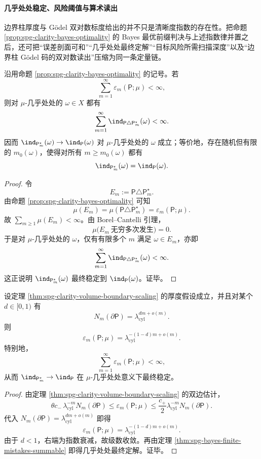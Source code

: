 
\paragraph{几乎处处稳定、风险阈值与算术读出}
边界柱厚度与 Gödel 双对数标度给出的并不只是清晰度指数的存在性。把命题 \ref{prop:spg-clarity-bayes-optimality} 的 Bayes 最优前缀判决与上述指数律并置之后，还可把“误差剖面可和”“几乎处处最终定解”“目标风险所需扫描深度”以及“边界柱 Gödel 码的双对数读出”压缩为同一条定量链。

\begin{theorem}\label{thm:spg-bayes-finite-mistakes-summable}
沿用命题 \ref{prop:spg-clarity-bayes-optimality} 的记号。若
\[
\sum_{m=1}^{\infty}\varepsilon_m(\mathsf P;\mu)<\infty,
\]
则对 \(\mu\)-几乎处处的 \(\omega\in X\) 都有
\[
\sum_{m=1}^{\infty}\ind_{\mathsf P\triangle \mathsf P_m^\star}(\omega)<\infty.
\]
因而 \(\ind_{\mathsf P_m^\star}(\omega)\to \ind_{\mathsf P}(\omega)\) 对 \(\mu\)-几乎处处的 \(\omega\) 成立；等价地，存在随机但有限的 \(m_0(\omega)\)，使得对所有 \(m\ge m_0(\omega)\) 都有
\[
\ind_{\mathsf P_m^\star}(\omega)=\ind_{\mathsf P}(\omega).
\]
\end{theorem}
\begin{proof}
令
\[
E_m:=\mathsf P\triangle \mathsf P_m^\star.
\]
由命题 \ref{prop:spg-clarity-bayes-optimality} 可知
\[
\mu(E_m)=\mu(\mathsf P\triangle \mathsf P_m^\star)=\varepsilon_m(\mathsf P;\mu).
\]
故 \(\sum_{m\ge 1}\mu(E_m)<\infty\)。由 Borel--Cantelli 引理，
\[
\mu\bigl(E_m\ \text{无穷多次发生}\bigr)=0.
\]
于是对 \(\mu\)-几乎处处的 \(\omega\)，仅有有限多个 \(m\) 满足 \(\omega\in E_m\)，亦即
\[
\sum_{m=1}^{\infty}\ind_{\mathsf P\triangle \mathsf P_m^\star}(\omega)<\infty.
\]
这正说明 \(\ind_{\mathsf P_m^\star}(\omega)\) 最终稳定到 \(\ind_{\mathsf P}(\omega)\)。证毕。
\end{proof}

\begin{corollary}[边界维数严格小于一时的几乎处处最终定解]\label{cor:spg-boundary-dimension-ae-stabilization}
设定理 \ref{thm:spg-clarity-volume-boundary-scaling} 的厚度假设成立，并且对某个 \(d\in[0,1)\) 有
\[
N_m(\partial\mathsf P)=\lambda_{\mathrm{cyl}}^{dm+o(m)}.
\]
则
\[
\varepsilon_m(\mathsf P;\mu)=\lambda_{\mathrm{cyl}}^{-(1-d)m+o(m)}.
\]
特别地，
\[
\sum_{m=1}^{\infty}\varepsilon_m(\mathsf P;\mu)<\infty,
\]
从而 \(\ind_{\mathsf P_m^\star}\to \ind_{\mathsf P}\) 在 \(\mu\)-几乎处处意义下最终稳定。
\end{corollary}
\begin{proof}
由定理 \ref{thm:spg-clarity-volume-boundary-scaling} 的双边估计，
\[
\theta c_-\,\lambda_{\mathrm{cyl}}^{-m}N_m(\partial\mathsf P)
\le
\varepsilon_m(\mathsf P;\mu)
\le
\frac{c_+}{2}\lambda_{\mathrm{cyl}}^{-m}N_m(\partial\mathsf P).
\]
代入 \(N_m(\partial\mathsf P)=\lambda_{\mathrm{cyl}}^{dm+o(m)}\) 即得
\[
\varepsilon_m(\mathsf P;\mu)=\lambda_{\mathrm{cyl}}^{-(1-d)m+o(m)}.
\]
由于 \(d<1\)，右端为指数衰减，故级数收敛。再由定理 \ref{thm:spg-bayes-finite-mistakes-summable} 即得几乎处处最终定解。证毕。
\end{proof}


